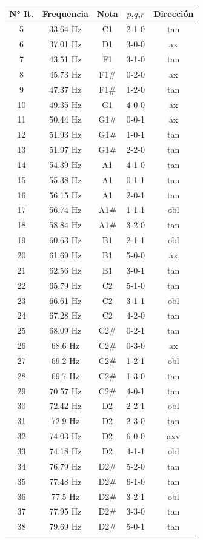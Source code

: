 \begin{table}[H]
\setlength\arrayrulewidth{1pt}
    \centering
    \begin{tabular}{|c|c|c|c|c|}
    \hline
N° It. & Frequencia & Nota & $p$,$q$,$r$ & Dirección \\
\hline \hline
5&33.64 Hz&C1&2-1-0&tan\\
6&37.01 Hz&D1&3-0-0&ax\\
7&43.51 Hz&F1&3-1-0&tan\\
8&45.73 Hz&F1\#&0-2-0&ax\\
9&47.37 Hz&F1\#&1-2-0&tan\\
10&49.35 Hz&G1&4-0-0&ax\\
11&50.44 Hz&G1\#&0-0-1&ax\\
12&51.93 Hz&G1\#&1-0-1&tan\\
13&51.97 Hz&G1\#&2-2-0&tan\\
14&54.39 Hz&A1&4-1-0&tan\\
15&55.38 Hz&A1&0-1-1&tan\\
16&56.15 Hz&A1&2-0-1&tan\\
17&56.74 Hz&A1\#&1-1-1&obl\\
18&58.84 Hz&A1\#&3-2-0&tan\\
19&60.63 Hz&B1&2-1-1&obl\\
20&61.69 Hz&B1&5-0-0&ax\\
21&62.56 Hz&B1&3-0-1&tan\\
22&65.79 Hz&C2&5-1-0&tan\\
23&66.61 Hz&C2&3-1-1&obl\\
24&67.28 Hz&C2&4-2-0&tan\\
25&68.09 Hz&C2\#&0-2-1&tan\\
26&68.6 Hz&C2\#&0-3-0&ax\\
27&69.2 Hz&C2\#&1-2-1&obl\\
28&69.7 Hz&C2\#&1-3-0&tan\\
29&70.57 Hz&C2\#&4-0-1&tan\\
30&72.42 Hz&D2&2-2-1&obl\\
31&72.9 Hz&D2&2-3-0&tan\\
32&74.03 Hz&D2&6-0-0&axv\\
33&74.18 Hz&D2&4-1-1&obl\\
34&76.79 Hz&D2\#&5-2-0&tan\\
35&77.48 Hz&D2\#&6-1-0&tan\\
36&77.5 Hz&D2\#&3-2-1&obl\\
37&77.95 Hz&D2\#&3-3-0&tan\\
38&79.69 Hz&D2\#&5-0-1&tan\\

\end{tabular}
\end{table}
